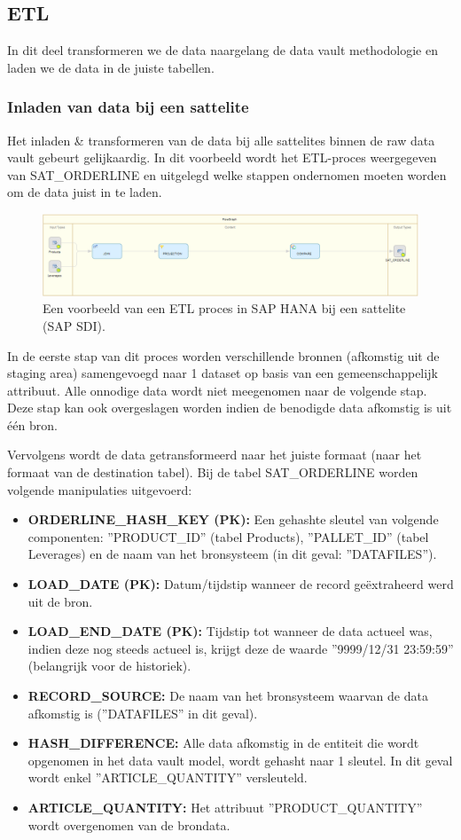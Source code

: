 \subsection{ETL}
In dit deel transformeren we de data naargelang de data vault methodologie en laden we de data in de juiste tabellen. 

\subsubsection{Inladen van data bij een sattelite}
Het inladen \& transformeren van de data bij alle sattelites binnen de raw data vault gebeurt gelijkaardig. In dit voorbeeld wordt het ETL-proces weergegeven van SAT\_ORDERLINE en uitgelegd welke stappen ondernomen moeten worden om de data juist in te laden.
\begin{figure}[h]
	\centering
	\includegraphics[scale=0.45]{../images/DV_FG_sattelite.png}
	\caption{Een voorbeeld van een ETL proces in SAP HANA bij een sattelite (SAP SDI).}
	\label{fig:etlsat}
\end{figure}
		
In de eerste stap van dit proces worden verschillende bronnen (afkomstig uit de staging area) samengevoegd naar 1 dataset op basis van een gemeenschappelijk attribuut. Alle onnodige data wordt niet meegenomen naar de volgende stap. Deze stap kan ook overgeslagen worden indien de benodigde data afkomstig is uit één bron.

Vervolgens wordt de data getransformeerd naar het juiste formaat (naar het formaat van de destination tabel). Bij de tabel SAT\_ORDERLINE worden volgende manipulaties uitgevoerd:

\begin{itemize}
	\item \textbf{ORDERLINE\_HASH\_KEY (PK):} Een gehashte sleutel van volgende componenten: ''PRODUCT\_ID'' (tabel Products), ''PALLET\_ID'' (tabel Leverages) en de naam van het bronsysteem (in dit geval: ''DATAFILES'').
	\item \textbf{LOAD\_DATE (PK):} Datum/tijdstip wanneer de record geëxtraheerd werd uit de bron.
	\item \textbf{LOAD\_END\_DATE (PK):} Tijdstip tot wanneer de data actueel was, indien deze nog steeds actueel is, krijgt deze de waarde ''9999/12/31 23:59:59'' (belangrijk voor de historiek).
	\item \textbf{RECORD\_SOURCE:} De naam van het bronsysteem waarvan de data afkomstig is (''DATAFILES'' in dit geval).
	\item \textbf{HASH\_DIFFERENCE:} Alle data afkomstig in de entiteit die wordt opgenomen in het data vault model, wordt gehasht naar 1 sleutel. In dit geval wordt enkel ''ARTICLE\_QUANTITY'' versleuteld. 
	\item \textbf{ARTICLE\_QUANTITY:} Het attribuut ''PRODUCT\_QUANTITY'' wordt overgenomen van de brondata.
\end{itemize} 

